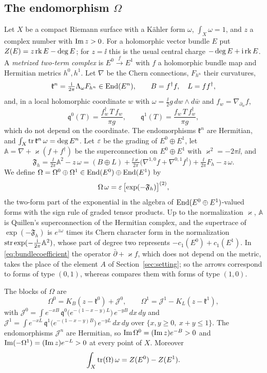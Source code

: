 \subsection{The endomorphism \texorpdfstring{$\Omega$}{Omega}}
Let $X$ be a compact Riemann surface with a K\"ahler form $\omega$,
$\int_X\omega=1$, and $z$ a complex number with $\operatorname{Im} z>0$. For a holomorphic
vector bundle $E$ put $Z(E)=z\operatorname{rk} E-\deg E$; for $z=\ii$ this is the usual
central charge $-\deg E+\mathrm i\operatorname{rk} E$. A \emph{metrized two-term
complex} is $E^0\xrightarrow{f}E^1$ with $f$ a holomorphic bundle map and
Hermitian metrics $h^0,h^1$. Let $\nabla$ be the Chern connections, $F_{h^n}$
their curvatures,
\[
 \mathfrak k^n=\tfrac{\mathrm i}{2\pi}\Lambda_\omega F_{h^n}\in\operatorname{End}(E^n),
 \qquad B=f^\dagger f,\quad L=ff^\dagger,
\]
and, in a local holomorphic coordinate $w$ with
$\omega=\frac{\ii}2g\,dw\wedge d\bar w$ and $f_w=\nabla_{\partial_w}f$,
\[
 \mathfrak q^0(T)=\frac{f_w^\dagger\,T\,f_w}{\pi g},\qquad
 \mathfrak q^1(T)=\frac{f_w\,T\,f_w^\dagger}{\pi g},
\]
which do not depend on the coordinate. The endomorphisms $\mathfrak k^n$ are
Hermitian, and $\int_X\operatorname{tr}\mathfrak k^n\,\omega=\deg E^n$. Let $\varepsilon$ be the
grading of $E^0\oplus E^1$, let $\mathbb A=\nabla+\varkappa(f+f^\dagger)$ be
the superconnection on $E^0\oplus E^1$ with $\varkappa^2=-2\pi\ii$, and
\[
 \mathfrak F_h=\tfrac{\ii}{2\pi}\mathbb A^2-z\,\omega
 =(B\oplus L)+\tfrac{\ii\varkappa}{2\pi}\bigl(\nabla^{1,0}f+\nabla^{0,1}f^\dagger\bigr)
 +\tfrac{\ii}{2\pi}F_h-z\,\omega .
\]
We define $\Omega=\Omega^0\oplus\Omega^1\in\operatorname{End}(E^0)\oplus\operatorname{End}(E^1)$ by
\begin{equation}\label{eq:bundlecoefficient}
 \Omega\,\omega=\varepsilon\,\bigl[\exp(-\mathfrak F_h)\bigr]^{(2)},
\end{equation}
the two-form part of the exponential in the algebra of
$\operatorname{End}(E^0\oplus E^1)$-valued forms with the sign rule of graded tensor
products. Up to the normalization $\varkappa$, $\mathbb A$ is Quillen's
superconnection of the Hermitian complex, and the supertrace of
$\exp(-\mathfrak F_h)$ is $e^{z\omega}$ times its Chern character form in the
normalization $\operatorname{str}\exp(-\frac{\mathrm i}{2\pi}\mathbb A^2)$, whose part of degree
two represents $-c_1(E^0)+c_1(E^1)$. In \eqref{eq:bundlecoefficient} the
operator $\bar\partial+\varkappa f$, which does not depend on the metric,
takes the place of the element $A$ of Section~\ref{sec:setting}; so the
arrows correspond to forms of type $(0,1)$, whereas
\cite[Remark~5.14]{hkkp26} compares them with forms of type $(1,0)$.

\begin{proposition}\label{prop:bundleformula}
The blocks of $\Omega$ are
\[
 \Omega^0=K_B(z-\mathfrak k^0)+\mathcal J^0,\qquad
 \Omega^1=\mathcal J^1-K_L(z-\mathfrak k^1),
\]
with
$\mathcal J^0=\int e^{-xB}\,\mathfrak q^0\bigl(e^{-(1-x-y)L}\bigr)\,e^{-yB}\,dx\,dy$
and
$\mathcal J^1=\int e^{-xL}\,\mathfrak q^1\bigl(e^{-(1-x-y)B}\bigr)\,e^{-yL}\,dx\,dy$
over $\{x,y\geq0,\ x+y\leq1\}$. The endomorphisms $\mathcal J^n$ are
Hermitian, so $\operatorname{Im}\Omega^0=(\operatorname{Im} z)e^{-B}>0$ and
$\operatorname{Im}(-\Omega^1)=(\operatorname{Im} z)e^{-L}>0$ at every point of $X$. Moreover
\[
 \int_X\operatorname{tr}(\Omega)\,\omega=Z(E^0)-Z(E^1).
\]
\end{proposition}

